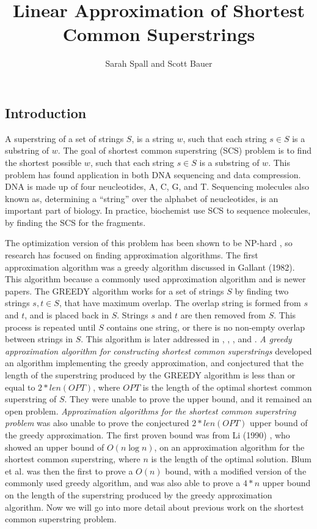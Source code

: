 \documentclass[letterpaper,11pt,titlepage]{article}
\title{Linear Approximation of Shortest Common Superstrings}
\author[1]{Sarah Spall and Scott Bauer}
\begin{document}
\maketitle
\newpage

\subsection*{Introduction}
A superstring of a set of strings $S$, is a string $w$, such that each string $s \in S$ is a substring
of $w$.  The goal of shortest common superstring (SCS) problem is to find the shortest possible $w$, such that each 
string $s \in S$ is a substring of $w$. This problem has found application in both DNA sequencing 
and data compression.  DNA is made up of four neucleotides, {A, C, G, and T}.  Sequencing molecules also known as,
determining a ``string'' over the alphabet of neucleotides, is an important part of biology. In practice, biochemist use SCS to sequence molecules, by finding the SCS for the fragments.

The optimization version of this problem has been shown to be NP-hard \cite{blum1991linear} \cite{gallant1980finding}, 
so research has focused on finding approximation algorithms.  The first approximation 
algorithm was a greedy algorithm discussed in Gallant (1982). This algorithm because a commonly used approximation algorithm and is newer papers.  The GREEDY algorithm works for a set of strings $S$ by finding two strings $s,t \in S$, that have maximum overlap.  The overlap string is formed from $s$ and $t$, and  is placed back in $S$.  Strings $s$ and $t$ are then removed from $S$.  This process is repeated until
$S$ contains one string, or there is no non-empty overlap between strings in $S$.  This algorithm is later
addressed in \cite{turner1989approximation}, \cite{tarhio1988greedy}, \cite{li1990towards}, and \cite{blum1991linear}.
\textit{A greedy approximation algorithm for constructing shortest common superstrings}\cite{tarhio1988greedy} developed an algorithm implementing the greedy approximation, and conjectured that 
the length of the superstring produced by the GREEDY algorithm is less than or equal to $2*len(OPT)$, where $OPT$ is the length of the optimal shortest common superstring of $S$.  They were unable
to prove the upper bound, and it remained an open problem. \textit{Approximation algorithms for the shortest common superstring problem} \cite{turner1989approximation} was also unable to prove
the conjectured $2*len(OPT)$ upper bound of the greedy approximation.  The first proven bound was from Li (1990) \cite{li1990towards}, who showed an upper bound of $O(n\log n)$, on an approximation algorithm for the shortest common superstring, where $n$ is the length of the optimal solution. Blum et al. \cite{blum1991linear} was then the first to prove a $O(n)$ bound, with a modified version of the commonly used greedy algorithm, and was also able to prove a $4*n$ upper bound on the length of the superstring produced by the greedy approximation algorithm.  Now we will go into more detail about previous work on the shortest common superstring problem. 
\end{document}
